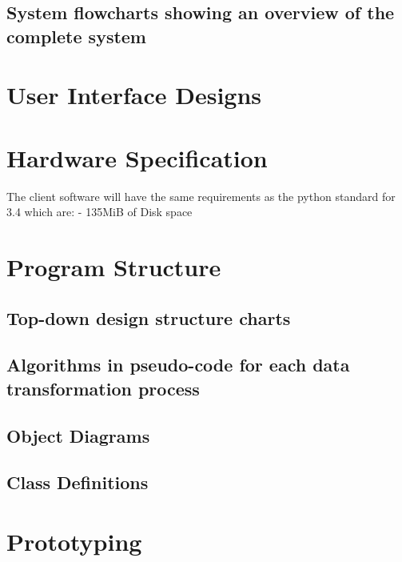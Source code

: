 \subsection{System flowcharts showing an overview of the complete system}

\section{User Interface Designs}


\section{Hardware Specification}
	The client software will have the same requirements as the python standard for 3.4 which are:
	- 135MiB of Disk space


\section{Program Structure}

\subsection{Top-down design structure charts}


\subsection{Algorithms in pseudo-code for each data transformation process}


\subsection{Object Diagrams}


\subsection{Class Definitions}


\section{Prototyping}


